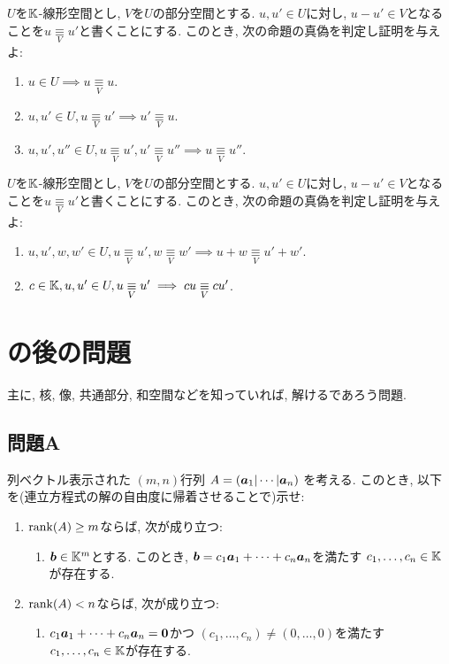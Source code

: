 \newcommand{\Mod}[1]{\mathrel{\underset{#1}{\equiv}}}
\begin{quiz}
  $U$を$\mathbb{K}$-線形空間とし, $V$を$U$の部分空間とする.
  $u,u'\in U$に対し,
  $u-u'\in V$となることを$u\Mod{V} u'$と書くことにする.
  このとき,
  次の命題の真偽を判定し証明を与えよ:
  \begin{enumerate}
  \item $u\in U \implies u \Mod{V} u$.
  \item $u,u'\in U, u \Mod{V} u' \implies u' \Mod{V} u$.    
  \item $u,u',u''\in U, u \Mod{V} u', u' \Mod{V} u'' \implies u \Mod{V} u''$.
  \end{enumerate}
\end{quiz}

\begin{quiz}
  $U$を$\mathbb{K}$-線形空間とし, $V$を$U$の部分空間とする.
  $u,u'\in U$に対し,
  $u-u'\in V$となることを$u\Mod{V} u'$と書くことにする.
  このとき,
  次の命題の真偽を判定し証明を与えよ:
  \begin{enumerate}
  \item $u,u', w,w'\in U, u \Mod{V} u', w \Mod{V} w' \implies u+w \Mod{V} u'+w'$.
  \item $c\in \KK,u,u'\in U, u \Mod{V} u'\implies cu \Mod{V} cu'$.
  \end{enumerate}
\end{quiz}

\section{の後の問題}
主に, 核, 像, 共通部分, 和空間などを知っていれば,
解けるであろう問題.

\subsection{問題A}
\begin{quiz}
  列ベクトル表示された
  $(m,n)$行列
  $A=(\boldsymbol{a}_1|\cdots|\boldsymbol{a}_n)$
  を考える.
  このとき, 以下を(連立方程式の解の自由度に帰着させることで)示せ:
  \begin{enumerate}
  \item
    $\operatorname{rank}(A)\geq m$ならば,
   次が成り立つ:
   \begin{enumerate}
   \item $\boldsymbol{b}\in\mathbb{K}^m$とする.
     このとき, $\boldsymbol{b}=c_1\boldsymbol{a}_1+\cdots+c_n\boldsymbol{a}_n$を満たす
     $c_1,\ldots,c_n\in\mathbb{K}$が存在する.
   \end{enumerate}
  \item
    $\operatorname{rank}(A)< n$ならば,
   次が成り立つ:
   \begin{enumerate}
   \item 
     $c_1\boldsymbol{a}_1+\cdots+c_n\boldsymbol{a}_n=\boldsymbol{0}$かつ
     $(c_1,\ldots,c_n)\neq (0,\ldots,0)$を満たす
     $c_1,\ldots,c_n\in\mathbb{K}$が存在する.
   \end{enumerate}
  \end{enumerate}
\end{quiz}

